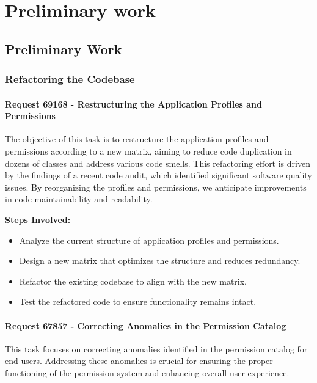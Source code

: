 %

\chapter{Preliminary work}
\label{cha:Preliminary work}


\section{Preliminary Work}

\subsection{Refactoring the Codebase}

\subsubsection{Request 69168 - Restructuring the Application Profiles and Permissions}

The objective of this task is to restructure the application profiles and permissions according to a new matrix, aiming to reduce code duplication in dozens of classes and address various code smells. This refactoring effort is driven by the findings of a recent code audit, which identified significant software quality issues. By reorganizing the profiles and permissions, we anticipate improvements in code maintainability and readability.

\textbf{Steps Involved:}
\begin{itemize}
    \item Analyze the current structure of application profiles and permissions.
    \item Design a new matrix that optimizes the structure and reduces redundancy.
    \item Refactor the existing codebase to align with the new matrix.
    \item Test the refactored code to ensure functionality remains intact.
\end{itemize}

\subsubsection{Request 67857 - Correcting Anomalies in the Permission Catalog}

This task focuses on correcting anomalies identified in the permission catalog for end users. Addressing these anomalies is crucial for ensuring the proper functioning of the permission system and enhancing overall user experience.

